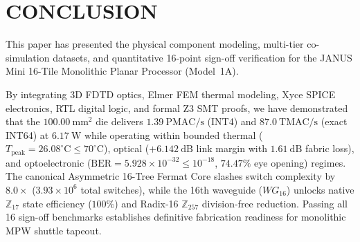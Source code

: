 \documentclass[journal]{IEEEtran}
\begin{document}
\section{CONCLUSION}

This paper has presented the physical component modeling, multi-tier co-simulation datasets, and quantitative 16-point sign-off verification for the JANUS Mini 16-Tile Monolithic Planar Processor (Model~1A).

By integrating 3D FDTD optics, Elmer FEM thermal modeling, Xyce SPICE electronics, RTL digital logic, and formal Z3 SMT proofs, we have demonstrated that the $100.00~\mathrm{mm^2}$ die delivers $1.39~\mathrm{PMAC/s}$ (INT4) and $87.0~\mathrm{TMAC/s}$ (exact INT64) at $6.17~\mathrm{W}$ while operating within bounded thermal ($T_{\mathrm{peak}} = 26.08^\circ\mathrm{C} \le 70^\circ\mathrm{C}$), optical ($+6.142~\mathrm{dB}$ link margin with $1.61~\mathrm{dB}$ fabric loss), and optoelectronic ($\mathrm{BER} = 5.928 \times 10^{-32} \le 10^{-18}$, $74.47\%$ eye opening) regimes. The canonical Asymmetric 16-Tree Fermat Core slashes switch complexity by $8.0\times$ ($3.93\times 10^6$ total switches), while the 16th waveguide ($WG_{16}$) unlocks native $\mathbb{Z}_{17}$ state efficiency ($100\%$) and Radix-16 $\mathbb{Z}_{257}$ division-free reduction. Passing all 16 sign-off benchmarks establishes definitive fabrication readiness for monolithic MPW shuttle tapeout.



\end{document}
